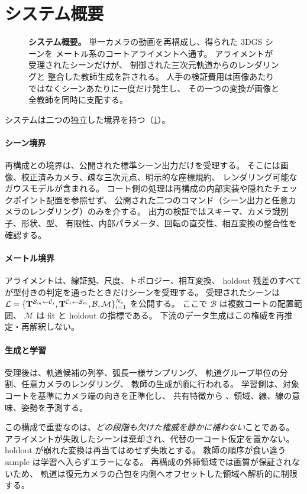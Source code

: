 \section{システム概要}
\label{sec:system}

\begin{figure}[t]
  \centering
  \resizebox{\linewidth}{!}{}
  \caption{\textbf{システム概要。}
  単一カメラの動画を再構成し、得られた 3DGS シーンを
  メートル系のコートアライメントへ通す。
  アライメントが受理されたシーンだけが、
  制御された三次元軌道からのレンダリングと
  整合した教師生成を許される。
  人手の検証費用は画像あたりではなくシーンあたりに一度だけ発生し、
  その一つの変換が画像と全教師を同時に支配する。
  }
  \label{fig:system}
\end{figure}

システムは二つの独立した境界を持つ（\cref{fig:system}）。

\paragraph{シーン境界}
再構成との境界は、公開された標準シーン出力だけを受理する。
そこには画像、校正済みカメラ、疎な三次元点、明示的な座標規約、
レンダリング可能なガウスモデルが含まれる。
コート側の処理は再構成の内部実装や隠れたチェックポイント配置を参照せず、
公開された二つのコマンド（シーン出力と任意カメラのレンダリング）のみを介する。
出力の検証ではスキーマ、カメラ識別子、形状、型、
有限性、内部パラメータ、回転の直交性、相互変換の整合性を確認する。

\paragraph{メートル境界}
アライメントは、線証拠、尺度、トポロジー、相互変換、
holdout 残差のすべてが型付きの判定を通ったときだけシーンを受理する。
受理されたシーンは
\(\mathcal{L}=\{\mathbf{T}^{\mathcal{S}_m\leftarrow \mathcal{C}_i},\mathbf{T}^{\mathcal{C}_i\leftarrow \mathcal{S}_m},
\mathcal{B},\mathcal{M}\}_{i=1}^{N_c}\)
を公開する。
ここで \(\mathcal{B}\) は複数コートの配置範囲、
\(\mathcal{M}\) は fit と holdout の指標である。
下流のデータ生成はこの権威を再推定・再解釈しない。

\paragraph{生成と学習}
受理後は、軌道候補の列挙、弧長一様サンプリング、
軌道グループ単位の分割、任意カメラのレンダリング、
教師の生成が順に行われる。
学習側は、対象コートを基準にカメラ端の向きを正準化し、
共有特徴から \KPName、領域、線、線の意味、姿勢を予測する。

この構成で重要なのは、\emph{どの段階も欠けた権威を静かに補わない}ことである。
アライメントが失敗したシーンは棄却され、代替の一コート仮定を置かない。
holdout が崩れた変換は再当てはめせず失敗とする。
教師の順序が食い違う sample は学習へ入らずエラーになる。
再構成の外挿領域では画質が保証されないため、
軌道は復元カメラの凸包を内側へオフセットした領域へ解析的に制限する。


